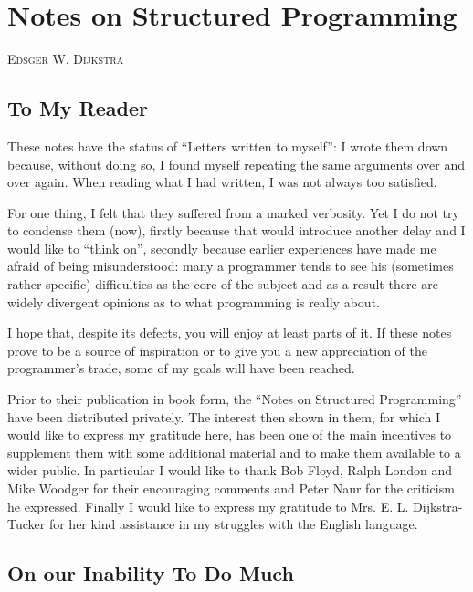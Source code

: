 \chapter{Notes on Structured Programming}

{
	\noindent
	\scshape\hfill\small Edsger W. Dijkstra\hfill
}
\renewcommand{\leftmark}{\normalfont\small\hfill E. W. DIJKSTRA\hfill}

\section{To My Reader}

These notes have the status of ``Letters written to myself'': I wrote them down because, without doing so, I found myself repeating the same arguments over and over again. When reading what I had written, I was not always too satisfied.

For one thing, I felt that they suffered from a marked verbosity. Yet I do not try to condense them (now), firstly because that would introduce another delay and I would like to ``think on'', secondly because earlier experiences have made me afraid of being misunderstood: many a programmer tends to see his (sometimes rather specific) difficulties as the core of the subject and as a result there are widely divergent opinions as to what programming is really about.

I hope that, despite its defects, you will enjoy at least parts of it. If these notes prove to be a source of inspiration or to give you a new appreciation of the programmer's trade, some of my goals will have been reached.

Prior to their publication in book form, the ``Notes on Structured Programming'' have been distributed privately. The interest then shown in
them, for which I would like to express my gratitude here, has been one of the main incentives to supplement them with some additional material and to make them available to a wider public. In particular I would like to thank Bob Floyd, Ralph London and Mike Woodger for their encouraging
comments and Peter Naur for the criticism he expressed. Finally I would like to express my gratitude to Mrs. E. L. Dijkstra-Tucker for her kind
assistance in my struggles with the English language.

\section{On our Inability To Do Much}
\label{sec:our-inability-to-do-much}

